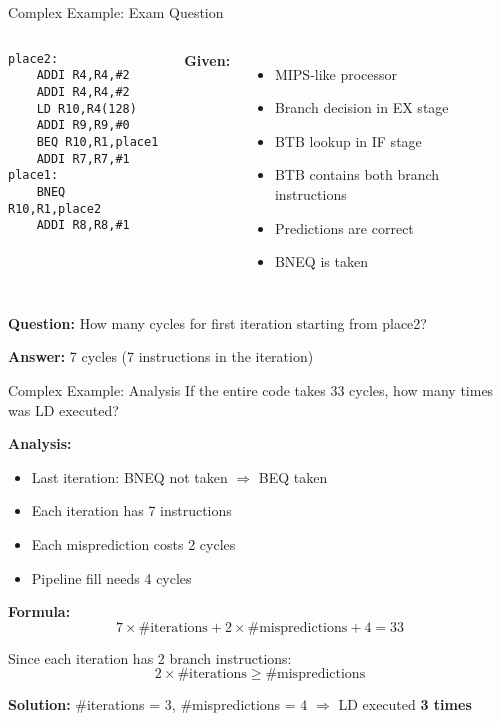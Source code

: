 \documentclass[aspectratio=169,12pt]{beamer}
\begin{document}
\begin{frame}[fragile]{Complex Example: Exam Question}
\begin{columns}
\begin{lstlisting}[language={[x86masm]Assembler}]
place2: 
    ADDI R4,R4,#2
    ADDI R4,R4,#2
    LD R10,R4(128)
    ADDI R9,R9,#0
    BEQ R10,R1,place1
    ADDI R7,R7,#1
place1: 
    BNEQ R10,R1,place2
    ADDI R8,R8,#1
\end{lstlisting}

\textbf{Given:}
\begin{itemize}
    \item MIPS-like processor
    \item Branch decision in EX stage
    \item BTB lookup in IF stage
    \item BTB contains both branch instructions
    \item Predictions are correct
    \item BNEQ is taken
\end{itemize}
\end{columns}

\vspace{0.3cm}
\textbf{Question:} How many cycles for first iteration starting from place2?

\textbf{Answer:} 7 cycles (7 instructions in the iteration)
\end{frame}

\begin{frame}{Complex Example: Analysis}
\textbf{} If the entire code takes 33 cycles, how many times was LD executed?

\textbf{Analysis:}
\begin{itemize}
    \item Last iteration: BNEQ not taken $\Rightarrow$ BEQ taken
    \item Each iteration has 7 instructions
    \item Each misprediction costs 2 cycles
    \item Pipeline fill needs 4 cycles
\end{itemize}

\textbf{Formula:}
$$7 \times \text{\#iterations} + 2 \times \text{\#mispredictions} + 4 = 33$$

Since each iteration has 2 branch instructions:
$$2 \times \text{\#iterations} \geq \text{\#mispredictions}$$

\textbf{Solution:} \#iterations = 3, \#mispredictions = 4
$\Rightarrow$ LD executed \textbf{3 times}
\end{frame}
\end{document}
